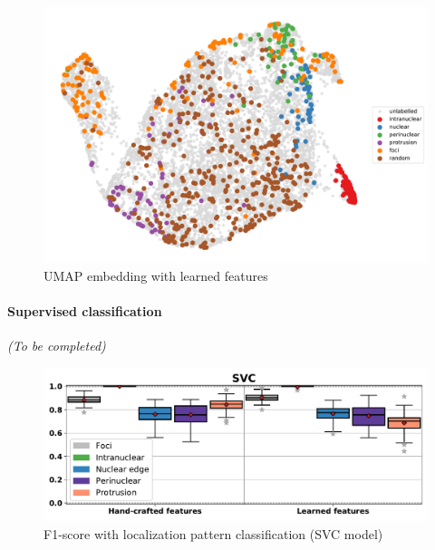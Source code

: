 \begin{figure}[h]
    \centering
    \includegraphics[width=1\textwidth]{figures/chapter4/umap_real}
    \caption{UMAP embedding with learned features}
    \label{fig:umap_real}
\end{figure}

\paragraph{Supervised classification}

\begin{center}
	\textit{(To be completed)}
\end{center}



\begin{figure}[h]
    \centering
    \includegraphics[width=1\textwidth]{figures/chapter4/f1_SVC}
    \caption{F1-score with localization pattern classification (SVC model)}
    \label{fig:f1_SVC_real}
\end{figure}

